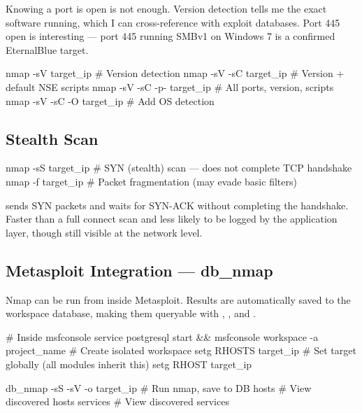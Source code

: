 \begin{whybox}
Knowing a port is open is not enough. Version detection tells me the exact software
running, which I can cross-reference with exploit databases. Port 445 open is
interesting --- port 445 running SMBv1 on Windows 7 is a confirmed EternalBlue target.
\end{whybox}

\begin{termbox}
nmap -sV target_ip               # Version detection
nmap -sV -sC target_ip           # Version + default NSE scripts
nmap -sV -sC -p- target_ip       # All ports, version, scripts
nmap -sV -sC -O target_ip        # Add OS detection
\end{termbox}



\subsection{Stealth Scan}

\begin{termbox}
nmap -sS target_ip               # SYN (stealth) scan --- does not complete TCP handshake
nmap -f target_ip                # Packet fragmentation (may evade basic filters)
\end{termbox}

\begin{notebox}
 sends SYN packets and waits for SYN-ACK without completing the handshake.
Faster than a full connect scan and less likely to be logged by the application layer,
though still visible at the network level.
\end{notebox}

\subsection{Metasploit Integration --- db\_nmap}

Nmap can be run from inside Metasploit. Results are automatically saved to the
workspace database, making them queryable with , , and
.



\begin{termbox}
# Inside msfconsole
service postgresql start && msfconsole
workspace -a project_name         # Create isolated workspace
setg RHOSTS target_ip             # Set target globally (all modules inherit this)
setg RHOST target_ip

db_nmap -sS -sV -o target_ip     # Run nmap, save to DB
hosts                             # View discovered hosts
services                          # View discovered services
\end{termbox}

